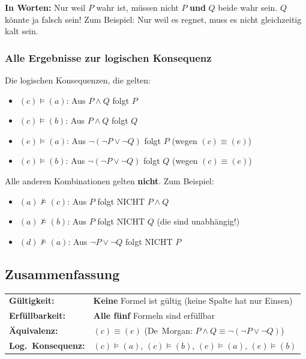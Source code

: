 \documentclass[a4paper,12pt]{article}
\begin{document}
\begin{analogie}
\textbf{In Worten:} Nur weil $P$ wahr ist, m\"ussen nicht $P$ \textbf{und} $Q$ beide wahr sein. $Q$ k\"onnte ja falsch sein! Zum Beispiel: Nur weil es regnet, muss es nicht gleichzeitig kalt sein.
\end{analogie}

\subsubsection*{Alle Ergebnisse zur logischen Konsequenz}

\begin{merkbox}
Die logischen Konsequenzen, die gelten:
\begin{itemize}
\item $(c) \models (a)$: Aus $P \wedge Q$ folgt $P$ \checkmark
\item $(c) \models (b)$: Aus $P \wedge Q$ folgt $Q$ \checkmark
\item $(e) \models (a)$: Aus $\neg(\neg P \vee \neg Q)$ folgt $P$ \checkmark \; (wegen $(c) \equiv (e)$)
\item $(e) \models (b)$: Aus $\neg(\neg P \vee \neg Q)$ folgt $Q$ \checkmark \; (wegen $(c) \equiv (e)$)
\end{itemize}

\medskip
Alle anderen Kombinationen gelten \textbf{nicht}. Zum Beispiel:
\begin{itemize}
\item $(a) \not\models (c)$: Aus $P$ folgt NICHT $P \wedge Q$
\item $(a) \not\models (b)$: Aus $P$ folgt NICHT $Q$ (die sind unabh\"angig!)
\item $(d) \not\models (a)$: Aus $\neg P \vee \neg Q$ folgt NICHT $P$
\end{itemize}
\end{merkbox}

\subsection{Zusammenfassung}

\begin{merkbox}[title={Gesamtergebnis Aufgabe 2}]
\renewcommand{\arraystretch}{1.3}
\begin{tabular}{ll}
\textbf{G\"ultigkeit:} & \textbf{Keine} Formel ist g\"ultig (keine Spalte hat nur Einsen) \\
\textbf{Erf\"ullbarkeit:} & \textbf{Alle f\"unf} Formeln sind erf\"ullbar \\
\textbf{\"Aquivalenz:} & $(c) \equiv (e)$ \quad (De~Morgan: $P \wedge Q \equiv \neg(\neg P \vee \neg Q)$) \\
\textbf{Log.\ Konsequenz:} & $(c) \models (a)$, \;$(c) \models (b)$, \;$(e) \models (a)$, \;$(e) \models (b)$ \\
\end{tabular}
\end{merkbox}
\end{document}
